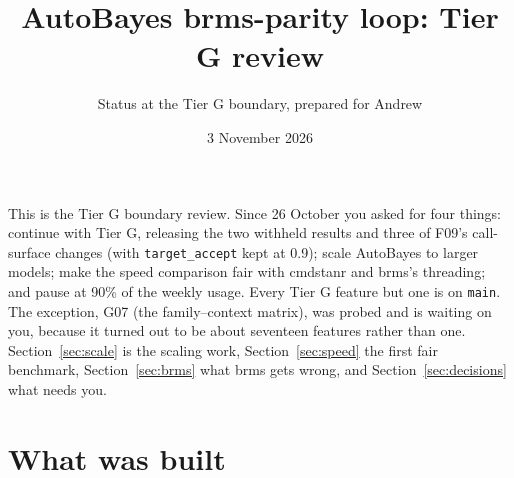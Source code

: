 \documentclass[11pt]{article}
\title{AutoBayes brms-parity loop: Tier G review}
\author{Status at the Tier G boundary, prepared for Andrew}
\date{3 November 2026}
\newcommand{\code}[1]{\texttt{#1}}
\begin{document}
\maketitle

\noindent This is the Tier G boundary review. Since 26 October you asked for four things: continue with Tier G, releasing the
two withheld results and three of F09's call-surface changes (with \code{target\_accept} kept at 0.9); scale AutoBayes to
larger models; make the speed comparison fair with cmdstanr and brms's threading; and pause at 90\% of the weekly usage.
Every Tier G feature but one is on \code{main}. The exception, G07 (the family--context matrix), was probed and is waiting on
you, because it turned out to be about seventeen features rather than one. Section~\ref{sec:scale} is the scaling work,
Section~\ref{sec:speed} the first fair benchmark, Section~\ref{sec:brms} what brms gets wrong, and
Section~\ref{sec:decisions} what needs you.

\section{What was built}
\end{document}
